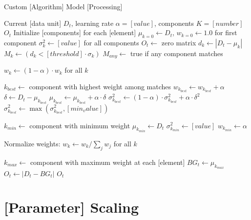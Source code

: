 \begin{algorithm}[!ht]
\caption{Custom [Algorithm] Model [Processing]}
\label{alg:custom_algorithm}
\begin{algorithmic}[1]
\REQUIRE Current [data unit] $D_t$, learning rate $\alpha=[value]$, components $K=[number]$
\ENSURE [Output] $O_t$
    \STATE Initialize [components] for each [element]
    \STATE $\mu_{k=0} \leftarrow D_t$, $w_{k=0} \leftarrow 1.0$ for first component
    \STATE $\sigma^2_k \leftarrow [value]$ for all components
    \STATE $O_t \leftarrow$ zero matrix
\ELSE
    \STATE $d_k \leftarrow |D_t - \mu_k|$ 
    \STATE $M_k \leftarrow (d_k < [threshold] \cdot \sigma_k)$ 
    \STATE $M_{any} \leftarrow$ true if any component matches
    
    \STATE $w_k \leftarrow (1-\alpha) \cdot w_k$ for all $k$ 
    
        \STATE $k_{best} \leftarrow$ component with highest weight among matches
        \STATE $w_{k_{best}} \leftarrow w_{k_{best}} + \alpha$
        \STATE $\delta \leftarrow D_t - \mu_{k_{best}}$ 
        \STATE $\mu_{k_{best}} \leftarrow \mu_{k_{best}} + \alpha \cdot \delta$
        \STATE $\sigma^2_{k_{best}} \leftarrow (1-\alpha) \cdot \sigma^2_{k_{best}} + \alpha \cdot \delta^2$
        \STATE $\sigma^2_{k_{best}} \leftarrow \max(\sigma^2_{k_{best}}, [min_value])$ 
    \ENDFOR
    
        \STATE $k_{min} \leftarrow$ component with minimum weight
        \STATE $\mu_{k_{min}} \leftarrow D_t$
        \STATE $\sigma^2_{k_{min}} \leftarrow [value]$ 
        \STATE $w_{k_{min}} \leftarrow \alpha$
    \ENDFOR
    
    \STATE Normalize weights: $w_k \leftarrow w_k/\sum_j w_j$ for all $k$
    
    \STATE $k_{max} \leftarrow$ component with maximum weight at each [element]
    \STATE $BG_t \leftarrow \mu_{k_{max}}$ 
    \STATE $O_t \leftarrow |D_t - BG_t|$ 
\ENDIF
\RETURN $O_t$
\end{algorithmic}
\end{algorithm}

\section{[Parameter] Scaling}

